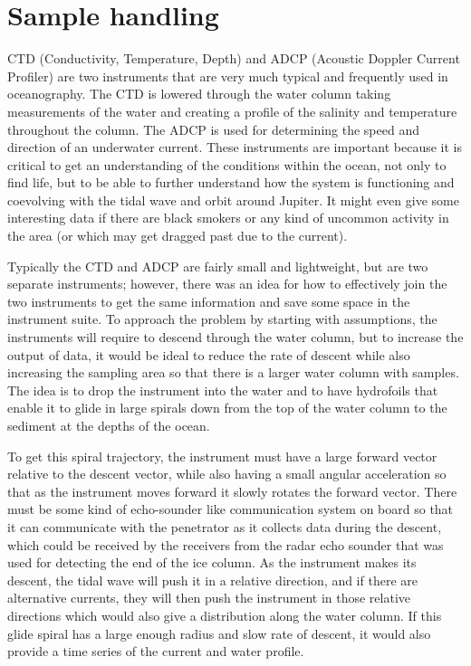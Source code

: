 \section{Sample handling}


CTD (Conductivity, Temperature, Depth) and ADCP (Acoustic Doppler Current Profiler) are two instruments that are very much typical and frequently used in oceanography. The CTD is lowered through the water column taking measurements of the water and creating a profile of the salinity and temperature throughout the column. The ADCP is used for determining the speed and direction of an underwater current. These instruments are important because it is critical to get an understanding of the conditions within the ocean, not only to find life, but to be able to further understand how the system is functioning and coevolving with the tidal wave and orbit around Jupiter. It might even give some interesting data if there are black smokers or any kind of uncommon activity in the area (or which may get dragged past due to the current).

Typically the CTD and ADCP are fairly small and lightweight, but are two separate instruments; however, there was an idea for how to effectively join the two instruments to get the same information and save some space in the instrument suite. To approach the problem by starting with assumptions, the instruments will require to descend through the water column, but to increase the output of data, it would be ideal to reduce the rate of descent while also increasing the sampling area so that there is a larger water column with samples. The idea is to drop the instrument into the water and to have hydrofoils that enable it to glide in large spirals down from the top of the water column to the sediment at the depths of the ocean. 

To get this spiral trajectory, the instrument must have a large forward vector relative to the descent vector, while also having a small angular acceleration so that as the instrument moves forward it slowly rotates the forward vector. There must be some kind of echo-sounder like communication system on board so that it can communicate with the penetrator as it collects data during the descent, which could be received by the receivers from the radar echo sounder that was used for detecting the end of the ice column. As the instrument makes its descent, the tidal wave will push it in a relative direction, and if there are alternative currents, they will then push the instrument in those relative directions which would also give a distribution along the water column. If this glide spiral has a large enough radius and slow rate of descent, it would also provide a time series of the current and water profile.


